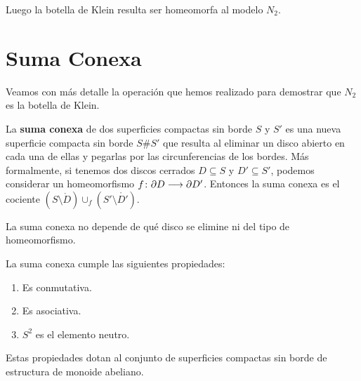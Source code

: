 \documentclass[GTS.tex]{subfiles}
\begin{document}
\begin{observacion}[Importante]

Luego la botella de Klein resulta ser homeomorfa al modelo $N_2$.
\end{observacion}

\section{Suma Conexa}

Veamos con más detalle la operación que hemos realizado para demostrar que $N_2$ es la botella de Klein.

\begin{defi}
La \textbf{suma conexa} de dos superficies compactas sin borde $S$ y $S'$ es una nueva superficie compacta sin borde $S\# S'$ que resulta al eliminar un disco abierto en cada una de ellas y pegarlas por las circunferencias de los bordes. Más formalmente, si tenemos dos discos cerrados $D\subseteq S$ y $D'\subseteq S'$, podemos considerar un homeomorfismo $f\colon{\partial D}\longrightarrow{\partial D'}$. Entonces la suma conexa es el cociente $(S\setminus \mathring{D})\cup_f(S'\setminus \mathring{D'})$.
\end{defi}

\begin{nota} La suma conexa no depende de qué disco se elimine ni del tipo de homeomorfismo.
\end{nota}

\begin{propi} La suma conexa cumple las siguientes propiedades:
\begin{enumerate}
\item Es conmutativa.
\item Es asociativa.
\item $S^2$ es el elemento neutro.
\end{enumerate}
Estas propiedades dotan al conjunto de superficies compactas sin borde de estructura de monoide abeliano.
\end{propi}
\end{document}
